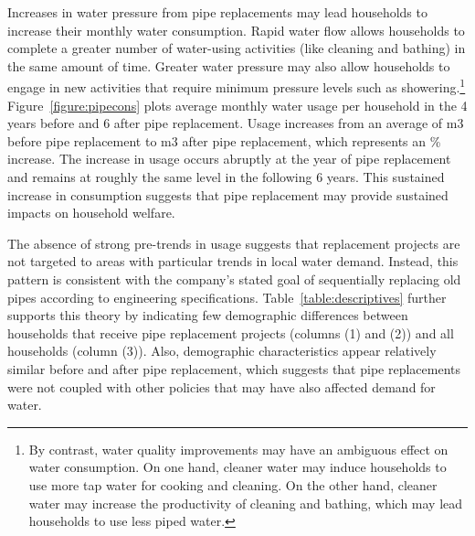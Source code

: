 \documentclass[12pt,table]{article}
\begin{document}
Increases in water pressure from pipe replacements may lead households to increase their monthly water consumption.  Rapid water flow allows households to complete a greater number of water-using activities (like cleaning and bathing) in the same amount of time.  Greater water pressure may also allow households to engage in new activities that require minimum pressure levels such as showering.\footnote{By contrast, water quality improvements may have an ambiguous effect on water consumption.  On one hand, cleaner water may induce households to use more tap water for cooking and cleaning.  On the other hand, cleaner water may increase the productivity of cleaning and bathing, which may lead households to use less piped water.}  Figure~\ref{figure:pipecons} plots average monthly water usage per household in the 4 years before and 6 after pipe replacement.  Usage increases from an average of m3 before pipe replacement to m3 after pipe replacement, which represents an \unskip\% increase.  The increase in usage occurs abruptly at the year of pipe replacement and remains at roughly the same level in the following 6 years.  This sustained increase in consumption suggests that pipe replacement may provide sustained impacts on household welfare.  

The absence of strong pre-trends in usage suggests that replacement projects are not targeted to areas with particular trends in local water demand.  Instead, this pattern is consistent with the company's stated goal of sequentially replacing old pipes according to engineering specifications.  Table~\ref{table:descriptives} further supports this theory by indicating few demographic differences between households that receive pipe replacement projects (columns (1) and (2)) and all households (column (3)).  Also, demographic characteristics appear relatively similar before and after pipe replacement, which suggests that pipe replacements were not coupled with other policies that may have also affected demand for water.  
\end{document}
